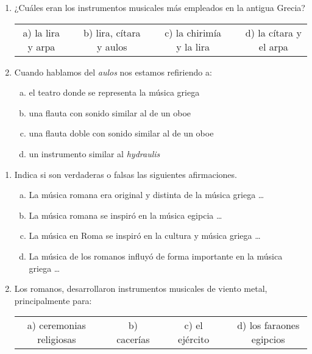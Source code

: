 \documentclass[letterpaper,12pt,notitlepage,spanish]{article}
\begin{document}
%
%
\begin{ejercicio}
	\begin{enumerate}[1.-]
%
%
	\item ¿Cuáles eran los instrumentos musicales más empleados en la antigua Grecia? \par
%
		\begin{tabular}{c c c c c c c}
		a) la lira y arpa & & 
		b) lira, cítara y aulos & & 
		c) la chirimía y la lira & & 
		d) la cítara y el arpa \\
		\end{tabular}
%
%
	\item Cuando hablamos del \textit{aulos} nos estamos refiriendo a:
		\begin{enumerate}[a)]
			\item el teatro donde se representa la música griega
			\item una flauta con sonido similar al de un oboe
			\item una flauta doble con sonido similar al de un oboe
			\item un instrumento similar al \textit{hydraulis}
		\end{enumerate}
	\end{enumerate}
\end{ejercicio}
%
%
\begin{ejercicio}
	\begin{enumerate}[1.-]
%
%
	\item Indica si son verdaderas o falsas las siguientes afirmaciones.
		\begin{enumerate}[a)]
			\item La música romana era original y distinta de la música griega \ldots
			\item La música romana se inspiró en la música egipcia \ldots
			\item La música en Roma se inspiró en la cultura y música griega \ldots
			\item La música de los romanos influyó de forma importante en la música griega \ldots
		\end{enumerate}
%
%
	\item Los romanos, desarrollaron instrumentos musicales de viento metal, principalmente para: \par
%
		\begin{tabular}{c c c c c c c}
		a) ceremonias religiosas & & 
		b) cacerías & & 
		c) el ejército & & 
		d) los faraones egipcios \\
		\end{tabular}
%
	\end{enumerate}
\end{ejercicio}
\end{document}
